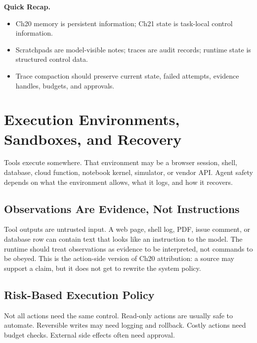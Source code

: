 \begin{quickrecap}
\textbf{Quick Recap.}
\begin{itemize}[nosep,leftmargin=1.5em]
  \item Ch20 memory is persistent information; Ch21 state is task-local control information.
  \item Scratchpads are model-visible notes; traces are audit records; runtime state is structured control data.
  \item Trace compaction should preserve current state, failed attempts, evidence handles, budgets, and approvals.
\end{itemize}
\end{quickrecap}


\section{Execution Environments, Sandboxes, and Recovery}
\label{sec:ch21-execution-sandboxes-recovery}

Tools execute somewhere. That environment may be a browser session, shell, database, cloud function, notebook kernel, simulator, or vendor API. Agent safety depends on what the environment allows, what it logs, and how it recovers.

\subsection{Observations Are Evidence, Not Instructions}

Tool outputs are untrusted input. A web page, shell log, PDF, issue comment, or database row can contain text that looks like an instruction to the model. The runtime should treat observations as evidence to be interpreted, not commands to be obeyed. This is the action-side version of Ch20 attribution: a source may support a claim, but it does not get to rewrite the system policy.

\subsection{Risk-Based Execution Policy}

Not all actions need the same control. Read-only actions are usually safe to automate. Reversible writes may need logging and rollback. Costly actions need budget checks. External side effects often need approval.

